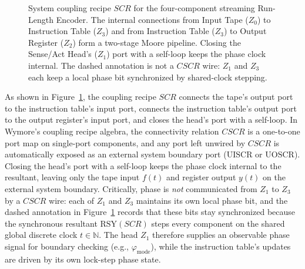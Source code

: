 \begin{figure}[t]
{%
  }
  \caption{System coupling recipe $SCR$ for the four-component streaming Run-Length Encoder. The internal connections from Input Tape ($Z_0$) to Instruction Table ($Z_3$) and from Instruction Table ($Z_3$) to Output Register ($Z_2$) form a two-stage Moore pipeline. Closing the Sense/Act Head's ($Z_1$) port with a self-loop keeps the phase clock internal. The dashed annotation is not a $CSCR$ wire: $Z_1$ and $Z_3$ each keep a local phase bit synchronized by shared-clock stepping.}
  \label{fig:rle-architecture}
\end{figure}

As shown in Figure~\ref{fig:rle-architecture}, the coupling recipe $SCR$ connects the tape's output port to the instruction table's input port, connects the instruction table's output port to the output register's input port, and closes the head's port with a self-loop. In Wymore's coupling recipe algebra, the connectivity relation $CSCR$ is a one-to-one port map on single-port components, and any port left unwired by $CSCR$ is automatically exposed as an external system boundary port ($\mathrm{UISCR}$ or $\mathrm{UOSCR}$). Closing the head's port with a self-loop keeps the phase clock internal to the resultant, leaving only the tape input $f(t)$ and register output $y(t)$ on the external system boundary. Critically, phase is \emph{not} communicated from $Z_1$ to $Z_3$ by a $CSCR$ wire: each of $Z_1$ and $Z_3$ maintains its own local phase bit, and the dashed annotation in Figure~\ref{fig:rle-architecture} records that these bits stay synchronized because the synchronous resultant $\mathrm{RSY}(SCR)$ steps every component on the shared global discrete clock $t\in\mathbb{N}$. The head $Z_1$ therefore supplies an observable phase signal for boundary checking (e.g., $\varphi_{\mathrm{mode}}$), while the instruction table's updates are driven by its own lock-step phase state.

